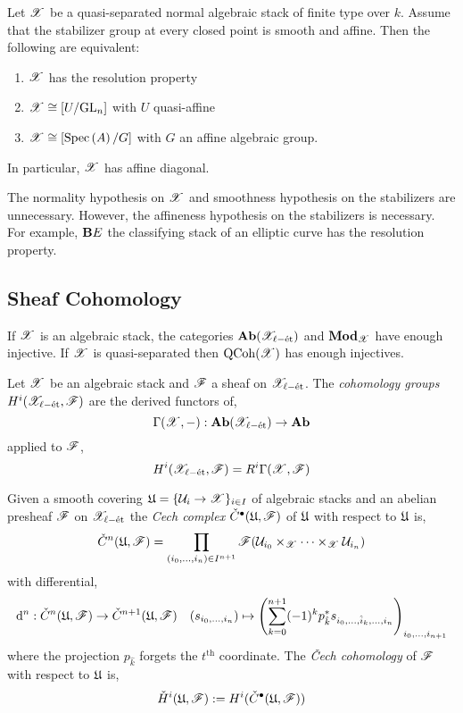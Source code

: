 \documentclass[12pt]{article}
\begin{document}
\begin{theorem}
Let $\mathscr{X}$ be a quasi-separated normal algebraic stack of finite type over $k$. Assume that the stabilizer group at every closed point is smooth and affine. Then the following are equivalent:
\begin{enumerate}
\item $\mathscr{X}$ has the resolution property
\item $\mathscr{X} \cong [U / \mathrm{GL}_n]$ with $U$ quasi-affine
\item $\mathscr{X} \cong [\mathrm{Spec}\left( A \right) / G]$ with $G$ an affine algebraic group.
\end{enumerate}
In particular, $\mathscr{X}$ has affine diagonal.
\end{theorem}

\begin{rmk}
The normality hypothesis on $\mathscr{X}$ and smoothness hypothesis on the stabilizers are unnecessary. However, the affineness hypothesis on the stabilizers is necessary. For example, $\mathbf{B} E$ the classifying stack of an elliptic curve has the resolution property. 
\end{rmk}

\subsection{Sheaf Cohomology}

\renewcommand{\Cech}{\check{C}}

\begin{lemma}
If $\mathscr{X}$ is an algebraic stack, the categories $\mathbf{Ab}(\mathscr{X}_{\ell-\text{\'{e}t}})$ and $\mathbf{Mod}_{\mathscr{X}}$ have enough injective. If $\mathscr{X}$ is quasi-separated then $\mathrm{QCoh}{(\mathscr{X})}$ has enough injectives.
\end{lemma}

\begin{defn}
Let $\mathscr{X}$ be an algebraic stack and $\mathscr{F}$ a sheaf on $\mathscr{X}_{\ell-\text{\'{e}t}}$. The \textit{cohomology groups} $H^i(\mathscr{X}_{\ell-\text{\'{e}t}}, \mathscr{F})$ are the derived functors of,
\[ \Gamma(\mathscr{X}, -) : \mathbf{Ab}(\mathscr{X}_{\ell-\text{\'{e}t}}) \to \mathbf{Ab} \]
applied to $\mathscr{F}$,
\[ H^i(\mathscr{X}_{\ell-\text{\'{e}t}}, \mathscr{F}) = R^i \Gamma(\mathscr{X}, \mathscr{F}) \]
\end{defn}

\begin{defn}
Given a smooth covering $\mathfrak{U} = \{ \mathcal{U}_i \to \mathscr{X} \}_{i \in I}$ of algebraic stacks and an abelian presheaf $\mathscr{F}$ on $\mathscr{X}_{\ell-\text{\'{e}t}}$ the \textit{Cech complex} $\Cech^\bullet(\fU, \F)$ of $\mathfrak{U}$ with respect to $\mathfrak{U}$ is,
\[ \Cech^n(\fU, \F) = \prod_{(i_0, \dots, i_n) \in I^{n+1}} \F(\cU_{i_0} \times_{\X} \cdots \times_{\X} \cU_{i_n}) \]
with differential,
\[ \d^n : \Cech^n(\fU, \F) \to \Cech^{n+1}(\fU, \F) \quad (s_{i_0, \dots, i_n}) \mapsto \left( \sum_{k = 0}^{n+1} (-1)^k p_{\hat{k}}^* s_{i_0, \dots, \hat{i}_k, \dots, i_n} \right)_{i_0, \dots, i_{n+1}} \]
where the projection $p_{\hat{k}}$ forgets the $t^{\text{th}}$ coordinate. The \textit{\v{C}ech cohomology} of $\mathscr{F}$ with respect to $\mathfrak{U}$ is,
\[ \check{H}^i(\fU, \F) := H^i(\Cech^\bullet(\fU, \F)) \] 
\end{defn}
\end{document}
